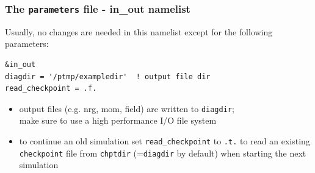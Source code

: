 \documentclass[10pt]{beamer}
\begin{document}
\begin{frame}[fragile]
  \frametitle{The {\tt parameters} file - in\_out namelist}

\begin{block}

Usually, no changes are needed in this namelist except for the following parameters:

\begin{block}

\begin{verbatim}
&in_out
diagdir = '/ptmp/exampledir'  ! output file dir
read_checkpoint = .f.
\end{verbatim}
\end{block}
\begin{itemize}
\item output files (e.g. nrg, mom, field) are written to {\tt diagdir};\\
make sure to use a high performance I/O file system
\item to continue an old simulation set {\tt read\_checkpoint} to {\tt .t.} to read an existing {\tt checkpoint} file from {\tt chptdir} (={\tt diagdir} by default) when starting the next simulation
\end{itemize}
\end{block}
\end{frame}


\end{document}
